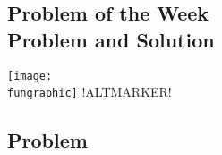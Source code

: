 \usepackage{amsmath,amssymb,amsfonts,array, color,epic,graphicx,fancyhdr,comment}
\usepackage[T1]{fontenc}
\usepackage{xstring, etoolbox, pdftexcmds,enumerate}%

\setlength{\topmargin}{-0.65in}
\setlength{\headheight}{0.5in}
\setlength{\headsep}{0.15in}
\setlength{\textheight}{9.4in}
\setlength{\footskip}{0in}

\addtolength{\oddsidemargin}{-48pt} %
\setlength{\textwidth}{17.2cm}
\setlength{\marginparsep}{0cm}
\setlength{\marginparwidth}{0cm}


\setlength{\parskip}{2mm} 

\pagestyle{fancy}
\renewcommand{\headrulewidth}{0pt} %




\begin{center}
\section{Problem of the Week \\ Problem \problemlevel{} and Solution}
\end{center}

\begin{center}
	\texttt{[image: \\fungraphic]}
	!ALTMARKER! \fungraphiccaption
\end{center}


\begin{flushleft}
\smtext
{
\subsection{Problem}
\problembody
}%
	{}
	{\vspace{5mm}}

\end{flushleft}


